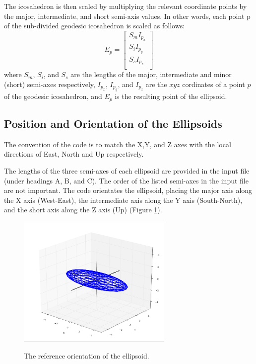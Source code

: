 \documentclass[11pt]{article}
\begin{document}
The icosahedron is then scaled by multiplying the relevant coordinate points by the major, intermediate, and short semi-axis values. In other words, each point p of the sub-divided geodesic icosahedron is scaled as follows:
\begin{equation}
  E_p = 
  \begin{bmatrix}
    S_m I_{p_x} \\
    S_i I_{p_y} \\
    S_s I_{p_z} \\
  \end{bmatrix}
\end{equation}
where $S_m$, $S_i$, and $S_s$ are the lengths of the major, intermediate and minor (short) semi-axes respectively, $I_{p_x}$, $I_{p_y}$, and $I_{p_z}$ are the $xyz$ cordinates of a point $p$ of the geodesic icosahedron, and $E_p$ is the resulting point of the ellipsoid.

\subsection{Position and Orientation of the Ellipsoids}

The convention of the code is to match the X,Y, and Z axes with the local directions of East, North and Up respectively.

The lengths of the three semi-axes of each ellipsoid are provided in the input file (under headings A, B, and C). The order of the listed semi-axes in the input file are not important. The code orientates the ellipsoid, placing the major axis along the X axis (West-East), the intermediate axis along the Y axis (South-North), and the short axis along the Z axis (Up) (Figure \ref{fig:ellipsoids1}).
\begin{figure}[h!]
  \caption{The reference orientation of the ellipsoid.}
  \centering
    \includegraphics[width=7.5cm]{ellipsoids1}
    \label{fig:ellipsoids1}
\end{figure}
\end{document}
